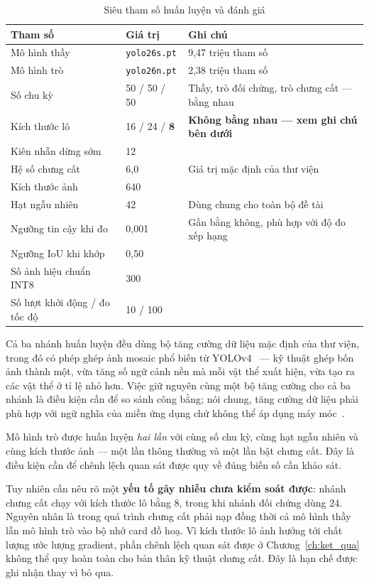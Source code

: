 \begin{table}[H]
\centering
\caption{Siêu tham số huấn luyện và đánh giá}
\label{tab:e3_cfg}
\small
\begin{tabular}{lll}
\toprule
\textbf{Tham số} & \textbf{Giá trị} & \textbf{Ghi chú} \\
\midrule
Mô hình thầy       & \texttt{yolo26s.pt} & 9,47 triệu tham số \\
Mô hình trò        & \texttt{yolo26n.pt} & 2,38 triệu tham số \\
Số chu kỳ          & 50 / 50 / 50 & Thầy, trò đối chứng, trò chưng cất --- bằng nhau \\
Kích thước lô      & 16 / 24 / \textbf{8} & \textbf{Không bằng nhau --- xem ghi chú bên dưới} \\
Kiên nhẫn dừng sớm & 12 & \\
Hệ số chưng cất    & 6,0 & Giá trị mặc định của thư viện \\
Kích thước ảnh     & 640 & \\
Hạt ngẫu nhiên     & 42 & Dùng chung cho toàn bộ đề tài \\
Ngưỡng tin cậy khi đo & 0,001 & Gần bằng không, phù hợp với độ đo xếp hạng \\
Ngưỡng IoU khi khớp   & 0,50 & \\
Số ảnh hiệu chuẩn INT8 & 300 & \\
Số lượt khởi động / đo tốc độ & 10 / 100 & \\
\bottomrule
\end{tabular}
\end{table}

Cả ba nhánh huấn luyện đều dùng bộ tăng cường dữ liệu mặc định của thư viện, trong đó có phép ghép
ảnh mosaic phổ biến từ YOLOv4~\cite{bochkovskiy2020yolov4} --- kỹ thuật ghép bốn ảnh thành một, vừa
tăng số ngữ cảnh nền mà mỗi vật thể xuất hiện, vừa tạo ra các vật thể ở tỉ lệ nhỏ hơn. Việc giữ
nguyên cùng một bộ tăng cường cho cả ba nhánh là điều kiện cần để so sánh công bằng; nói chung,
tăng cường dữ liệu phải phù hợp với ngữ nghĩa của miền ứng dụng chứ không thể áp dụng máy
móc~\cite{shorten2019augmentation}.

Mô hình trò được huấn luyện \emph{hai lần} với cùng số chu kỳ, cùng hạt ngẫu nhiên và cùng kích
thước ảnh --- một lần thông thường và một lần bật chưng cất. Đây là điều kiện cần để chênh lệch
quan sát được quy về đúng biến số cần khảo sát.

Tuy nhiên cần nêu rõ một \textbf{yếu tố gây nhiễu chưa kiểm soát được}: nhánh chưng cất chạy với
kích thước lô bằng 8, trong khi nhánh đối chứng dùng 24. Nguyên nhân là trong quá trình chưng cất
phải nạp đồng thời cả mô hình thầy lẫn mô hình trò vào bộ nhớ card đồ hoạ. Vì kích thước lô ảnh
hưởng tới chất lượng ước lượng gradient, phần chênh lệch quan sát được ở Chương~\ref{ch:ket_qua}
không thể quy hoàn toàn cho bản thân kỹ thuật chưng cất. Đây là hạn chế được ghi nhận thay vì bỏ
qua.

